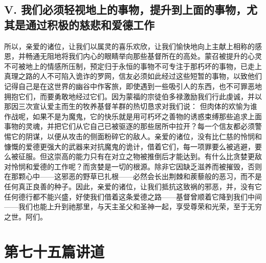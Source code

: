 
\subsection{V. 我们必须轻视地上的事物，提升到上面的事物，尤其是通过积极的慈悲和爱德工作}

所以，亲爱的诸位，让我们以属灵的喜乐欢欣，让我们愉快地向上主献上相称的感恩，并畅通无阻地将我们内心的眼睛举向那些基督所在的高处。蒙召被提升的心灵不可被地上的情感所压制，预定归于永恒的事物不可专注于那朽坏的事物，已走上真理之路的人不可陷入诡诈的罗网，信友必须如此经过这些短暂的事物，以致他们记得自己是在这世界的幽谷中作客旅，即使遇到一些吸引人的东西，也不可罪恶地拥抱它们，而要勇敢地经过它们。因为蒙福的宗徒伯多禄激励我们行此虔诚，并以那因三次宣认爱主而生的牧养基督羊群的热切恳求对我们说： 但肉体的欢愉为谁作战呢，如果不是为魔鬼，它的快乐就是用可朽坏之善物的诱惑束缚那些追求上面事物的灵魂，并把它们从它自己已被驱逐的那些居所中拉开？每一个信友都必须警惕它的阴谋，以便从攻击的侧面粉碎它的敌人。亲爱的诸位，没有比仁慈的怜悯和慷慨的爱德更强大的武器来对抗魔鬼的诡计，借着它们，每一项罪要么被逃避，要么被征服。但这崇高的能力只有在对立之物被推倒后才能达到。有什么比贪婪更敌对怜悯和爱德的工作呢？而贪婪是一切的根源。除非它因缺乏滋养而被摧毁，否则在那颗心中——这邪恶的野草已扎根——必然会长出荆棘和蒺藜般的恶习，而不是任何真正良善的种子。因此，亲爱的诸位，让我们抵抗这致祸的邪恶，并，没有它任何德行都不能兴盛，好使我们借着这条爱德之路——基督曾顺着它降到我们中间——我们也能上升到祂那里，与天主圣父和圣神一起，享受尊荣和光荣，至于无穷之世。阿们。\par



\section{第七十五篇讲道}

\par



